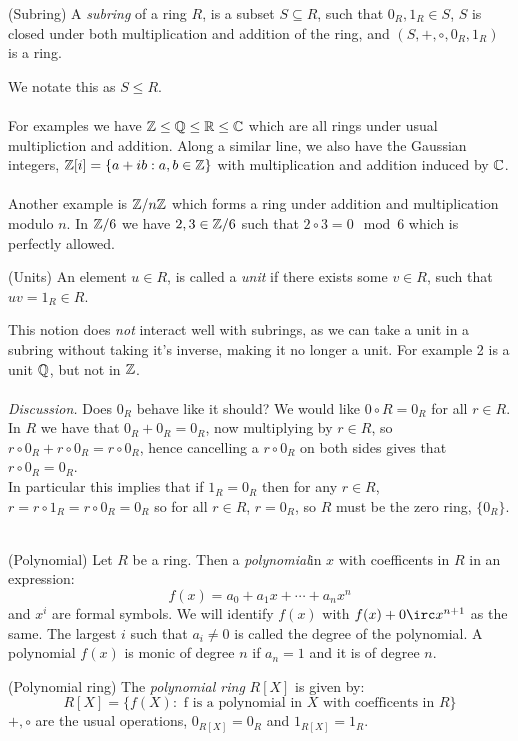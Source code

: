 \documentclass{article}
\begin{document}
\begin{itemize}
\begin{definition}
	(Subring) A \textit{subring} of a ring $ R $, is a subset $ S\subseteq R $, such that $ 0_R,1_R\in S $, $ S $ is closed under both multiplication and addition of the ring, and $ (S,+,\circ, 0_R,1_R) $ is a ring. 
\end{definition}
We notate this as $ S\le R $.\\\\
For examples we have $ \mathbb{Z}\le\mathbb{Q}\le\mathbb{R}\le\mathbb{C} $ which are all rings under usual multipliction and addition. Along a similar line, we also have the Gaussian integers, $ \mathbb{Z}[i]=\{a+ib:a,b\in \mathbb{Z}\} $ with multiplication and addition induced by $ \mathbb{C} $.\\
\\
Another example is $ \mathbb{Z}/n\mathbb{Z} $ which forms a ring under addition and multiplication modulo $ n $. In $ \mathbb{Z}/6 $ we have $ 2, 3\in \mathbb{Z}/6 $ such that $ 2\circ 3=0\mod 6 $ which is perfectly allowed.

\begin{definition}
	(Units) An element $ u\in R $, is called a \textit{unit} if there exists some $ v\in R $, such that $ uv=1_R\in R $.
\end{definition}
This notion does \textit{not} interact well with subrings, as we can take a unit in a subring without taking it's inverse, making it no longer a unit. For example 2 is a unit $ \mathbb{Q} $, but not in $ \mathbb{Z} $.
\\\\\textit{Discussion.} Does $ 0_R $ behave like it should? We would like $ 0\circ R=0_R $ for all $ r\in R $. In $ R $ we have that $ 0_R+0_R =0_R $, now multiplying by $ r\in R $, so $ r\circ 0_R+r\circ 0_R=r\circ 0_R $, hence cancelling a $ r\circ 0_R $ on both sides gives that $ r\circ 0_R=0_R $.\\
In particular this implies that if $ 1_R=0_R $ then for any $ r\in R $, $ r=r\circ 1_R=r\circ 0_R=0_R $ so for all $ r\in R $, $ r=0_R $, so $ R $ must be the zero ring, $ \{0_R\} $.\\\\

\begin{definition}
	(Polynomial) Let $ R $ be a ring. Then a \textit{polynomial}in $ x $ with coefficents in $ R $ in an expression:
	\[
		f(x)=a_0+a_1x+\cdots+a_nx^n
	\]
	and $ x^i $ are formal symbols. We will identify $ f(x) $ with $ f(x)+0\irc x^{n+1} $ as the same. The largest $ i $ such that $ a_i \ne 0$ is called the degree of the polynomial. A polynomial $ f(x) $ is monic of degree $ n $ if $ a_n=1 $ and it is of degree $ n $.
\end{definition} 
\begin{definition}
	(Polynomial ring) The \textit{polynomial ring} $ R[X] $ is given by:
	\[
		R[X]= \{f(X): \text{ f is a polynomial in } X \text { with coefficents in } R\}
	\]
	$+, \circ  $ are the usual operations, $ 0_{R[X]}=0_R $ and $ 1_{R[X]}=1_R $.
\end{definition}


\end{itemize}
\end{document}
